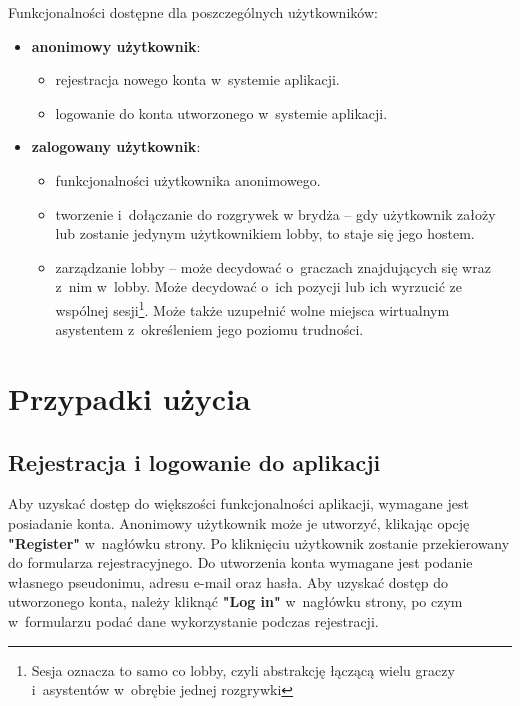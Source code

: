 Funkcjonalności dostępne dla poszczególnych użytkowników:
\begin{itemize}
  \item \textbf{anonimowy użytkownik}:
        \begin{itemize}
          \item rejestracja nowego konta w~systemie aplikacji.
          \item logowanie do konta utworzonego w~systemie aplikacji.
        \end{itemize}

  \item \textbf{zalogowany użytkownik}:
        \begin{itemize}
          \item funkcjonalności użytkownika anonimowego.
          \item tworzenie i~dołączanie do rozgrywek w brydża --
                gdy użytkownik założy lub zostanie jedynym
                użytkownikiem lobby, to staje się jego
                hostem.
          \item zarządzanie lobby -- może decydować o~graczach znajdujących się wraz
                z~nim w~lobby. Może decydować o~ich pozycji lub ich wyrzucić
                ze wspólnej sesji\footnote{Sesja oznacza to samo co lobby, czyli
                  abstrakcję łączącą wielu graczy i~asystentów w~obrębie jednej
                  rozgrywki}.
                Może także uzupełnić wolne miejsca wirtualnym asystentem
                z~określeniem jego poziomu trudności.
        \end{itemize}
\end{itemize}

\FloatBarrier

\section{Przypadki użycia}

\subsection{Rejestracja i logowanie do aplikacji}

Aby uzyskać dostęp do większości funkcjonalności aplikacji, wymagane
jest posiadanie konta. Anonimowy użytkownik może je utworzyć, klikając
opcję \textbf{"Register"} w~nagłówku strony. Po kliknięciu użytkownik
zostanie przekierowany do formularza rejestracyjnego.
Do utworzenia konta wymagane jest podanie własnego
pseudonimu, adresu e-mail oraz hasła. Aby uzyskać dostęp do utworzonego
konta, należy kliknąć \textbf{"Log in"} w~nagłówku strony, po czym
w~formularzu podać dane wykorzystanie podczas rejestracji.


